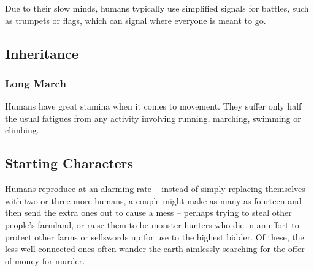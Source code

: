 \begin{multicols}{2}
Due to their slow minds, humans typically use simplified signals for battles, such as trumpets or flags, which can signal where everyone is meant to go.

\subsection{Inheritance}

\subsubsection{Long March}

Humans have great stamina when it comes to movement.
They suffer only half the usual \glspl{fatigue} from any activity involving running, marching, swimming or climbing.

\subsection{Starting Characters}

Humans reproduce at an alarming rate -- instead of simply replacing themselves with two or three more humans, a couple might make as many as fourteen and then send the extra ones out to cause a mess -- perhaps trying to steal other people's farmland, or raise them to be monster hunters who die in an effort to protect other farms or sellswords up for use to the highest bidder.
Of these, the less well connected ones often wander the earth aimlessly searching for the offer of money for murder.

\end{multicols}

